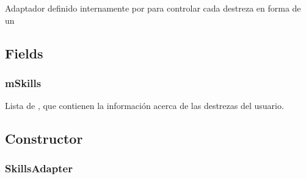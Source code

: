 \documentclass[letterpaper,10pt,english]{sphinxmanual}
\begin{document}
\begin{fulllineitems}
\label{Adapter/SkillsAdapter:com.fiuba.tallerii.jobify.SkillsAdapter}
Adaptador definido internamente por  para controlar cada destreza en forma de un 

\end{fulllineitems}



\subsection{Fields}
\label{Adapter/SkillsAdapter:fields}

\subsubsection{mSkills}
\label{Adapter/SkillsAdapter:mskills}

\begin{fulllineitems}
\label{Adapter/SkillsAdapter:com.fiuba.tallerii.jobify.SkillsAdapter.mSkills}
Lista de , que contienen la información acerca de las destrezas del usuario.

\end{fulllineitems}



\subsection{Constructor}
\label{Adapter/SkillsAdapter:constructor}

\subsubsection{SkillsAdapter}
\label{Adapter/SkillsAdapter:id1}
\end{document}
